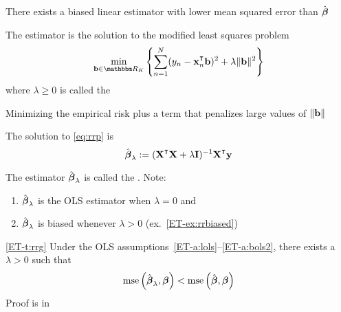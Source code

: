 \begin{frame}

    \vspace{2em}
    There
    exists a biased linear estimator with lower mean squared error than
    $\hat {\boldsymbol \beta}$
    
    The estimator is the solution to the modified least
    squares problem 
    \begin{equation}
        \label{eq:rrp}
        \min_{\boldb \in \RR_K}
        \left\{
         \sum_{n=1}^N (y_n - \boldx_n^\T \boldb)^2 + \lambda \| \boldb \|^2
         \right\}
    \end{equation}
    where $\lambda \geq 0$ is called the 
    
    \vspace{.7em}
    Minimizing the empirical risk plus a term that
    penalizes large values of $\| {\mathbf b} \|$
    
    The solution to \eqref{eq:rrp} is
    \begin{equation}
        \label{eq:rrs}
        \hboldbeta_{\lambda} 
            := (\boldX^\T \boldX + \lambda \boldI)^{-1} \boldX^\T \boldy
    \end{equation}
    
\end{frame}

\begin{frame}
    
    \vspace{2em}
    The estimator $\hat {\boldsymbol \beta}_{\lambda}$ is called the . Note: 
    \begin{enumerate}
        \item $\hat {\boldsymbol \beta}_\lambda$ is the OLS estimator when $\lambda = 0$ and
        \item $\hat {\boldsymbol \beta}_\lambda$ is biased whenever $\lambda > 0$ (ex.~\ref{ET-ex:rrbiased})
    \end{enumerate}
   
   \vspace{.7em}
       \Thm
        \eqref{ET-t:rrg}
        Under the OLS assumptions~\ref{ET-a:lols}--\ref{ET-a:bols2}, there exists a
        $\lambda > 0$ such that 
        \begin{equation*}
            \operatorname{mse} \left(\hat {\boldsymbol \beta}_{\lambda}, {\boldsymbol \beta} \right) < 
            \operatorname{mse} \left( \hat {\boldsymbol \beta}, {\boldsymbol \beta} \right)
        \end{equation*}
    Proof is in \cite{hoerl1970ridge}

\end{frame}

